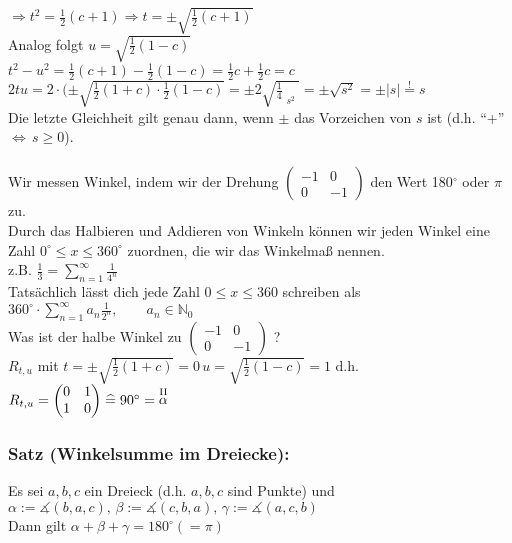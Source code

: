 $\Rightarrow t^{2} = \frac{1}{2}(c+1) \Rightarrow t = \pm \sqrt{\frac{1}{2}(c+1)}$\\
Analog folgt $u=\sqrt{\frac{1}{2}(1-c)}$ \\
$t^{2}-u^{2} = \frac{1}{2}(c+1)-\frac{1}{2}(1-c)=\frac{1}{2}c + \frac{1}{2}c = c$\\
$2tu=2\cdot(\pm\sqrt{\frac{1}{2}(1+c)\cdot\frac{1}{2}(1-c)} = \pm 2 \sqrt{\frac{1}{4}\mathop{\underbrace{(1-c^{2})}}\limits_{s^{2}}} = \pm \sqrt{s^{2}} = \pm \vert s \vert \mathop{=}\limits^{\text{!}} s$\\
Die letzte Gleichheit gilt genau dann, wenn $\pm$ das Vorzeichen von $s$ ist (d.h. "`+"' $\Leftrightarrow \, s \geq 0$).\\
\qquad\\
Wir messen Winkel, indem wir der Drehung $\begin{pmatrix} -1 & 0 \\ 0 & -1 \end{pmatrix}$ den Wert 180$^{\circ}$ oder $\pi$ zu.\\
Durch das Halbieren und Addieren von Winkeln können wir jeden Winkel eine Zahl $0^{\circ} \leq x \leq 360^{\circ}$ zuordnen, die wir das Winkelmaß nennen. \\
z.B. $\frac{1}{3} = \sum\limits^{\infty}_{n=1} \frac{1}{4^{n}}$\\
Tatsächlich lässt dich jede Zahl $ 0 \leq x \leq 360 $ schreiben als $360^{\circ} \cdot  \sum\limits^{\infty}_{n=1}a_{n}\frac{1}{2^{n}}, \qquad a_{n}\in  \mathbb{N}_{0}$ \\
Was ist der halbe Winkel zu $\begin{pmatrix} -1 & 0 \\ 0 & -1 \end{pmatrix}$ ?\\
$R_{t,u}$ mit $t = \pm \sqrt{\frac{1}{2}(1+c)} = 0 \, u = \sqrt{\frac{1}{2}(1-c)} = 1$ d.h. $R_{t,u} = \begin{pmatrix} 0 & 1 \\ 1 & 0 \end{pmatrix} \mathrel{\widehat{=}} 90^{\circ} = \mathop{\alpha}\limits^{\text{\RM{2}}}$
%
%
%
\subsubsection{Satz (Winkelsumme im Dreiecke):}
Es sei $a,b,c$ ein Dreieck (d.h. $a,b,c$ sind Punkte) und $\alpha := \measuredangle ( b,a,c), \, \beta := \measuredangle(c,b,a), \, \gamma := \measuredangle (a,c,b)$\\
Dann gilt $\alpha + \beta + \gamma = 180^{\circ} (=\pi)$
%
%
%
